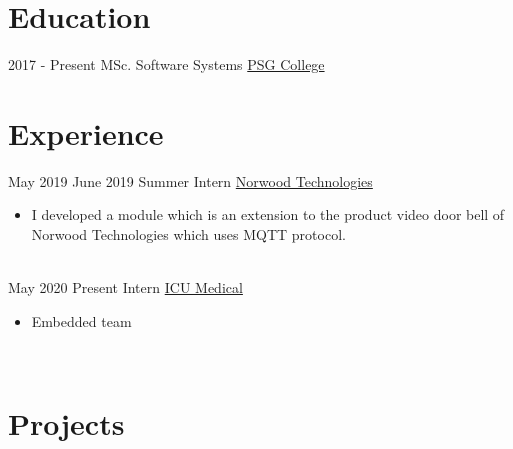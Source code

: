 \documentclass[letterpaper]{Baseclass}
\begin{document}
\makeprofile 

\section{Education}

\begin{envvar}
	\envvaritem
    	{2017 - Present}
        {}
        {\hspace{0.2cm}MSc. Software Systems }
        {\href{http://www.psgtech.edu/}{\hspace{0.27cm}PSG College}}
        {}
        {} 
\end{envvar}


\section{Experience}

\begin{envvar}
	\envvaritem
		{May 2019}
		{June 2019}
		{\hspace{0.3cm}Summer Intern}
		{\href{https://www.linkedin.com/company/norwoodtechnologies/}{Norwood Technologies}}
		{}
		{\begin{itemize}
			\item I developed a module which is an extension to the product video door bell of Norwood Technologies which uses MQTT protocol.
		\end{itemize}}
		\\
	\envvaritem
    	{May 2020}
		{Present}
        {\hspace{0.3cm}Intern}
        {\href{https://www.icumed.com/}{ICU Medical}}
        {}
        {\begin{itemize}
        \item Embedded team
        \end{itemize}}
        \\           
\end{envvar}

\section{Projects}
\end{document}
